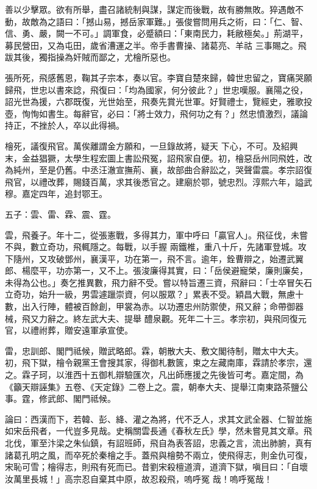\begin{pinyinscope}
 善以少擊眾。欲有所舉，盡召諸統制與謀，謀定而後戰，故有勝無敗。猝遇敵不動，故敵為之語曰：「撼山易，撼岳家軍難。」張俊嘗問用兵之術，曰：「仁、智、信、勇、嚴，闕一不可。」調軍食，必蹙額曰：「東南民力，耗敝極矣。」荊湖平，募民營田，又為屯田，歲省漕運之半。帝手書曹操、諸葛亮、羊祜
 三事賜之。飛跋其後，獨指操為奸賊而鄙之，尤檜所惡也。



 張所死，飛感舊恩，鞠其子宗本，奏以官。李寶自楚來歸，韓世忠留之，寶痛哭願歸飛，世忠以書來諗，飛復曰：「均為國家，何分彼此？」世忠嘆服。襄陽之役，詔光世為援，六郡既復，光世始至，飛奏先賞光世軍。好賢禮士，覽經史，雅歌投壺，恂恂如書生。每辭官，必曰：「將士效力，飛何功之有？」然忠憤激烈，議論持正，不挫於人，卒以此得禍。



 檜死，議復飛官。萬俟離謂金方願和，一旦錄故將，疑天
 下心，不可。及紹興末，金益猖獗，太學生程宏圖上書訟飛冤，詔飛家自便。初，檜惡岳州同飛姓，改為純州，至是仍舊。中丞汪澈宣撫荊、襄，故部曲合辭訟之，哭聲雷震。孝宗詔復飛官，以禮改葬，賜錢百萬，求其後悉官之。建廟於鄂，號忠烈。淳熙六年，謚武穆。嘉定四年，追封鄂王。



 五子：雲、雷、霖、震、霆。



 雲，飛養子。年十二，從張憲戰，多得其力，軍中呼曰「贏官人」。飛征伐，未嘗不與，數立奇功，飛輒隱之。每戰，以手握
 兩鐵椎，重八十斤，先諸軍登城。攻下隨州，又攻破鄧州，襄漢平，功在第一，飛不言。逾年，銓曹辯之，始遷武翼郎、楊麼平，功亦第一，又不上。張浚廉得其實，曰：「岳侯避寵榮，廉則廉矣，未得為公也。」奏乞推異數，飛力辭不受。嘗以特旨遷三資，飛辭曰：「士卒冒矢石立奇功，始升一級，男雲遽躐崇資，何以服眾？」累表不受。穎昌大戰，無慮十數，出入行陣，體被百餘創，甲裳為赤。以功遷忠州防禦使，飛又辭；命帶御器械，飛又力辭之。終左武大夫、提舉
 醴泉觀。死年二十三。孝宗初，與飛同復元官，以禮祔葬，贈安遠軍承宣使。



 雷，忠訓郎、閣門祗候，贈武略郎。霖，朝散大夫、敷文閣待制，贈太中大夫。初，飛下獄，檜令親黨王會搜其家，得御札數篋，束之左藏南庫，霖請於孝宗，還之。霖子珂，以淮西十五御札辯驗匯次，凡出師應援之先後皆可考。嘉定間，為《籲天辯誣集》五卷、《天定錄》二卷上之。震，朝奉大夫、提舉江南東路茶鹽公事。霆，修武郎、閣門祗候。



 論曰：西漢而下，若韓、彭、絳、灌之為將，代不乏人，求其文武全器、仁智並施如宋岳飛者，一代豈多見哉。史稱關雲長通《春秋左氏》學，然未嘗見其文章。飛北伐，軍至汴梁之朱仙鎮，有詔班師，飛自為表答詔，忠義之言，流出肺腑，真有諸葛孔明之風，而卒死於秦檜之手。蓋飛與檜勢不兩立，使飛得志，則金仇可復，宋恥可雪；檜得志，則飛有死而已。昔劉宋殺檀道濟，道濟下獄，嗔目曰：「自壞汝萬里長城！」高宗忍自棄其中原，故忍殺飛，嗚呼冤
 哉！嗚呼冤哉！



\end{pinyinscope}